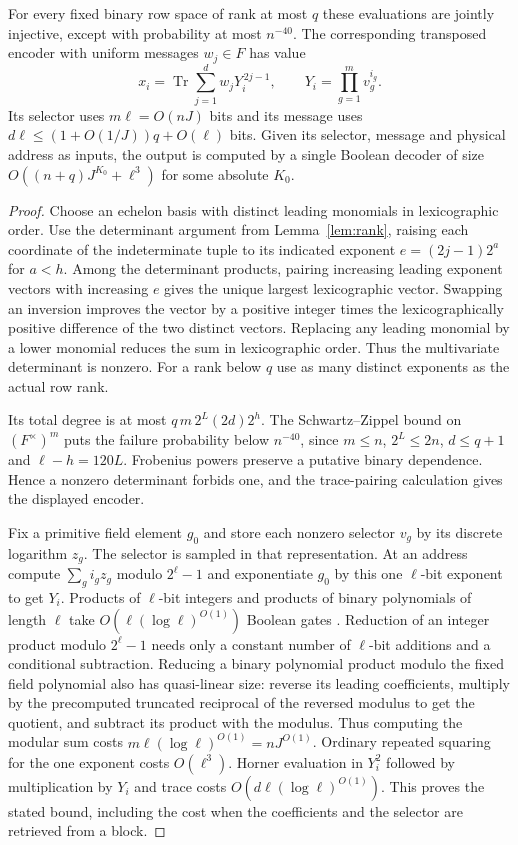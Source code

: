 \begin{lemma}\label{lem:digits}
For every fixed binary row space of rank at most $q$ these evaluations are jointly injective, except with probability at most $n^{-40}$. The corresponding transposed encoder with uniform messages $w_j\in F$ has value
\[
      x_i=\operatorname{Tr}\sum_{j=1}^d w_j Y_i^{\,2j-1},
                \qquad Y_i=\prod_{g=1}^m v_g^{i_g}.
\]
Its selector uses $m\ell=O(nJ)$ bits and its message uses $d\ell\le(1+O(1/J))q+O(\ell)$ bits. Given its selector, message and physical address as inputs, the output is computed by a single Boolean decoder of size $O((n+q)J^{K_0}+\ell^3)$ for some absolute $K_0$.
\end{lemma}
\begin{proof}
Choose an echelon basis with distinct leading monomials in lexicographic order. Use the determinant argument from Lemma~\ref{lem:rank}, raising each coordinate of the indeterminate tuple to its indicated exponent $e=(2j-1)2^a$ for $a<h$. Among the determinant products, pairing increasing leading exponent vectors with increasing $e$ gives the unique largest lexicographic vector. Swapping an inversion improves the vector by a positive integer times the lexicographically positive difference of the two distinct vectors. Replacing any leading monomial by a lower monomial reduces the sum in lexicographic order. Thus the multivariate determinant is nonzero. For a rank below $q$ use as many distinct exponents as the actual row rank.

Its total degree is at most $q\,m\,2^L(2d)2^h$. The Schwartz--Zippel bound on $(F^\times)^m$ puts the failure probability below $n^{-40}$, since $m\le n$, $2^L\le2n$, $d\le q+1$ and $\ell-h=120L$. Frobenius powers preserve a putative binary dependence. Hence a nonzero determinant forbids one, and the trace-pairing calculation gives the displayed encoder.

Fix a primitive field element $g_0$ and store each nonzero selector $v_g$ by its discrete logarithm $z_g$. The selector is sampled in that representation. At an address compute $\sum_g i_g z_g$ modulo $2^\ell-1$ and exponentiate $g_0$ by this one $\ell$-bit exponent to get $Y_i$. Products of $\ell$-bit integers and products of binary polynomials of length $\ell$ take $O(\ell(\log\ell)^{O(1)})$ Boolean gates \cite{intmult,polyprod}. Reduction of an integer product modulo $2^\ell-1$ needs only a constant number of $\ell$-bit additions and a conditional subtraction. Reducing a binary polynomial product modulo the fixed field polynomial also has quasi-linear size: reverse its leading coefficients, multiply by the precomputed truncated reciprocal of the reversed modulus to get the quotient, and subtract its product with the modulus. Thus computing the modular sum costs $m\ell(\log\ell)^{O(1)}=nJ^{O(1)}$. Ordinary repeated squaring for the one exponent costs $O(\ell^3)$. Horner evaluation in $Y_i^2$ followed by multiplication by $Y_i$ and trace costs $O(d\ell(\log\ell)^{O(1)})$. This proves the stated bound, including the cost when the coefficients and the selector are retrieved from a block.
\end{proof}

